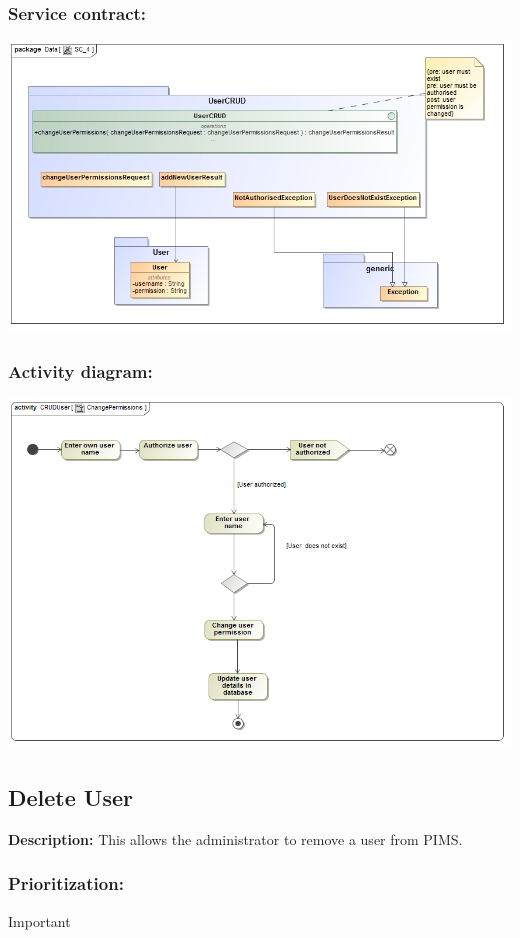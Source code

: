 \subsubsection{Service contract:}
\includegraphics[width=1\linewidth]{./Graphics/5.jpg}
\subsubsection{Activity diagram:}
\includegraphics[width=1\linewidth]{./Graphics/ChangePermissions.png}

\subsection{Delete User}
\textbf{Description:}
This allows the administrator to remove a user from PIMS.
\subsubsection{Prioritization:}
Important
